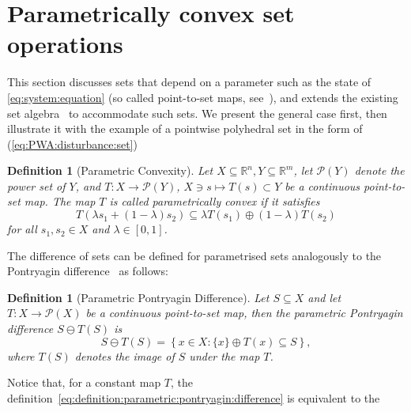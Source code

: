 \documentclass[letterpaper, 10pt, conference]{ieeeconf} %
\newtheorem{defn}[thm]{Definition}
\begin{document}
\section{Parametrically convex set operations}\label{sec:parametrically:convex:set:operations}
This section discusses sets that depend on a parameter such as the state of \eqref{eq:system:equation} (so called point-to-set maps, 
see~\cite{Hogan:1973}), and extends the existing set algebra~\cite{blanchini:2007} to 
accommodate such sets. We present the general case first, then illustrate it with the example of a pointwise polyhedral set in the form of (\ref{eq:PWA:disturbance:set})
%
%
    \begin{defn}[Parametric Convexity]\label{def:parametric:convexity}
      Let $X\subseteq\mathbb R^n, Y\subseteq\mathbb R^m$, let $\mathcal P(Y)$ denote the power set of $Y$, 
      and $T:X\rightarrow \mathcal P(Y)$, $X\ni s\mapsto T(s)\subset Y$ be a 
      continuous point-to-set map. The map $T$ is called \emph{parametrically convex} if it satisfies
      \begin{equation}\label{eq:pconvexdef}
        T(\lambda s_1 + (1-\lambda)s_2)\subseteq\lambda T(s_1) \oplus (1-\lambda) T(s_2)
      \end{equation}
      for all $s_1,s_2\in X$ and $\lambda\in[0,1]$.
    \end{defn}
%
%
The difference of sets can be defined for parametrised sets analogously to the Pontryagin difference~\cite{Kolmanovsky:1998} as follows:
%
    \begin{defn}[Parametric Pontryagin Difference]\label{def:parametric:pontryagin:difference}
Let $S\subseteq X$ and let $T:X\to\mathcal P(X)$ be a continuous point-to-set map,
then the \emph{parametric Pontryagin difference} $S\ominus T(S)$ is 
      \begin{equation}\label{eq:definition:parametric:pontryagin:difference}
        S\ominus T(S) = \left\{x\in X: \{x\} \oplus T(x)\subseteq S\right\},
      \end{equation}
      where $T(S)$ denotes the image of $S$ under the map $T$. 
    \end{defn}
%
    Notice that, for a constant map $T$, the definition~\eqref{eq:definition:parametric:pontryagin:difference} is equivalent to the 
\end{document}

